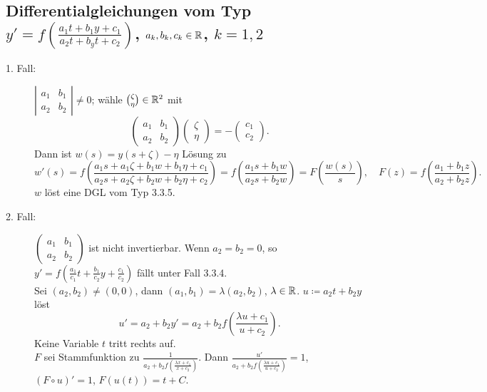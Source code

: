 \subsection{Differentialgleichungen vom Typ $ y'=f\left(\frac{a_1t+b_1y+c_1}{a_2t+b_yt+c_2}\right) $, $ a_k,b_k,c_k\in\mathbb{R} $, $ k=1,2 $}
\begin{description}
	\item[1. Fall:] $ \left|\begin{smallmatrix}
	a_1&b_1\\a_2&b_2
	\end{smallmatrix}\right|\neq 0 $; w\"ahle $ \binom{\zeta}{\eta}\in\mathbb{R}^2 $ mit 
	\[ \begin{pmatrix}
	a_1&b_1\\a_2&b_2
	\end{pmatrix} \begin{pmatrix}
	\zeta\\\eta
	\end{pmatrix}=-\begin{pmatrix}
	c_1\\c_2
	\end{pmatrix}. \]
	Dann ist $ w(s)=y(s+\zeta)-\eta $ L\"osung zu 
	\[ w'(s)=f\left(\frac{a_1s+a_1\zeta+b_1w+b_1\eta+c_1}{a_2s+a_2\zeta+b_2w+b_2\eta+c_2}\right)=f\left(\frac{a_1s+b_1w}{a_2s+b_2w}\right)=F\left(\frac{w(s)}{s}\right),\quad F(z)=f\left(\frac{a_1+b_1z}{a_2+b_2z}\right). \]
	$ w $ l\"ost eine DGL vom Typ 3.3.5.
	\item[2. Fall:] $ \left(\begin{smallmatrix}
	a_1&b_1\\a_2&b_2
	\end{smallmatrix}\right) $ ist nicht invertierbar. Wenn $ a_2=b_2=0 $, so $ y'=f\left(\frac{a_1}{c_1}t+\frac{b_1}{c_2}y+\frac{c_1}{c_2}\right) $ f\"allt unter Fall 3.3.4.\\
	Sei $ (a_2,b_2)\neq(0,0) $, dann $ (a_1,b_1)=\lambda(a_2,b_2) $, $ \lambda\in\mathbb{R} $. $ u\coloneqq a_2t+b_2y $ l\"ost \[ u'=a_2+b_2y'=a_2+b_2f\left(\frac{\lambda u+c_1}{u+c_2}\right). \]
	Keine Variable $ t $ tritt rechts auf. \\
	$ F $ sei Stammfunktion zu $ \frac{1}{a_2+b_2 f\left(\frac{\lambda x+c_1}{x+c_2}\right)} $. Dann $ \frac{u'}{a_2+b_2 f\left(\frac{\lambda u+c_1}{u+c_2}\right)}=1 $, $ (F\circ u)'=1 $, $ F(u(t))=t+C $.
\end{description}
